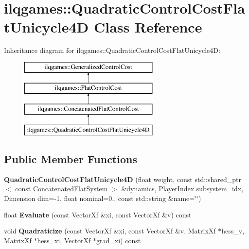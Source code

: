 \hypertarget{classilqgames_1_1_quadratic_control_cost_flat_unicycle4_d}{}\section{ilqgames\+:\+:Quadratic\+Control\+Cost\+Flat\+Unicycle4D Class Reference}
\label{classilqgames_1_1_quadratic_control_cost_flat_unicycle4_d}
Inheritance diagram for ilqgames\+:\+:Quadratic\+Control\+Cost\+Flat\+Unicycle4D\+:\begin{figure}[H]
\begin{center}
\leavevmode
\includegraphics[height=4.000000cm]{classilqgames_1_1_quadratic_control_cost_flat_unicycle4_d}
\end{center}
\end{figure}
\subsection*{Public Member Functions}
\begin{DoxyCompactItemize}
\item 
{\bfseries Quadratic\+Control\+Cost\+Flat\+Unicycle4D} (float weight, const std\+::shared\+\_\+ptr$<$ const \hyperlink{classilqgames_1_1_concatenated_flat_system}{Concatenated\+Flat\+System} $>$ \&dynamics, Player\+Index subsystem\+\_\+idx, Dimension dim=-\/1, float nominal=0., const std\+::string \&name=\char`\"{}\char`\"{})\hypertarget{classilqgames_1_1_quadratic_control_cost_flat_unicycle4_d_a84d09e6af0d89e953936769d70de6428}{}\label{classilqgames_1_1_quadratic_control_cost_flat_unicycle4_d_a84d09e6af0d89e953936769d70de6428}

\item 
float {\bfseries Evaluate} (const Vector\+Xf \&xi, const Vector\+Xf \&v) const \hypertarget{classilqgames_1_1_quadratic_control_cost_flat_unicycle4_d_a2c6e31dad86f0af2e14112b998b3e7b6}{}\label{classilqgames_1_1_quadratic_control_cost_flat_unicycle4_d_a2c6e31dad86f0af2e14112b998b3e7b6}

\item 
void {\bfseries Quadraticize} (const Vector\+Xf \&xi, const Vector\+Xf \&v, Matrix\+Xf $\ast$hess\+\_\+v, Matrix\+Xf $\ast$hess\+\_\+xi, Vector\+Xf $\ast$grad\+\_\+xi) const \hypertarget{classilqgames_1_1_quadratic_control_cost_flat_unicycle4_d_a8c2fc1c80d6dea2ea2cebb6a3cb0a273}{}\label{classilqgames_1_1_quadratic_control_cost_flat_unicycle4_d_a8c2fc1c80d6dea2ea2cebb6a3cb0a273}

\end{DoxyCompactItemize}
